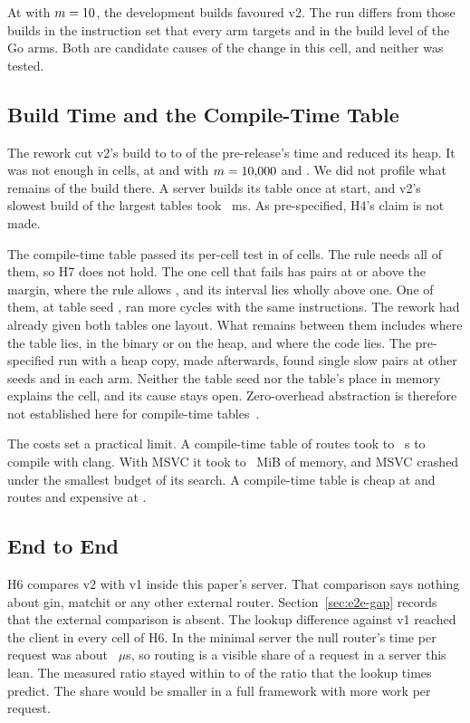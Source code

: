 At  with $m=10$, the development builds favoured v2. The run differs from those
builds in the instruction set that every arm targets and in the build level of the Go arms. Both are
candidate causes of the change in this cell, and neither was tested.

\subsection{Build Time and the Compile-Time Table}

The rework cut v2's build to \AbBuildMin{} to \AbBuildMax{} of the pre-release's time and reduced its
heap. It was not enough in \HFourLostBuild{} cells, at  and  with
$m=10{,}000$ and \SizeHundredThousand. We did not profile what remains of the build there. A
server builds its table once at start, and v2's slowest build of the largest tables took
\HFourBuildMaxMs~ms. As pre-specified, H4's claim is not made.

The compile-time table passed its per-cell test in \HSevenHeld{} of \HSevenCells{} cells. The rule
needs all of them, so H7 does not hold. The one cell that fails has \HSevenLostAboveMargin{} pairs at
or above the margin, where the rule allows \HSevenAllowedAbove, and its interval lies wholly above
one. One of them, at table seed \HSevenLostSeed, ran more cycles with the same instructions. The
rework had already given both tables one layout. What remains between them includes where the table
lies, in the binary or on the heap, and where the code lies. The pre-specified run with a heap copy,
made afterwards, found single slow pairs at other seeds and in each arm. Neither the table seed nor
the table's place in memory explains the cell, and its cause stays open. Zero-overhead abstraction is therefore not established
here for compile-time tables~\cite{stroustrup2012foundations}.

The costs set a practical limit. A compile-time table of \SizeThousand{} routes took
\ClangThousandCompileMin{} to \ClangThousandCompileMax~s to compile with clang. With MSVC it took
\MsvcPeakMinMiB{} to \MsvcPeakMaxMiB~MiB of memory, and MSVC crashed under the smallest budget of its
search. A compile-time table is cheap at \SizeTen{} and \SizeHundred{} routes and expensive at
\SizeThousand.

\subsection{End to End}

H6 compares v2 with v1 inside this paper's server.
That comparison says nothing about gin, matchit or any other external router.
Section~\ref{sec:e2e-gap} records that the external comparison is absent.
The lookup difference against v1 reached the client in every cell of H6. In the minimal server the
null router's time per request was about \HSixNullUsMin~$\mu$s, so routing is a visible share of a
request in a server this lean. The measured ratio stayed within \HSixPredMin{} to \HSixPredMax{} of
the ratio that the lookup times predict. The share would be smaller in a full framework with more
work per request.

